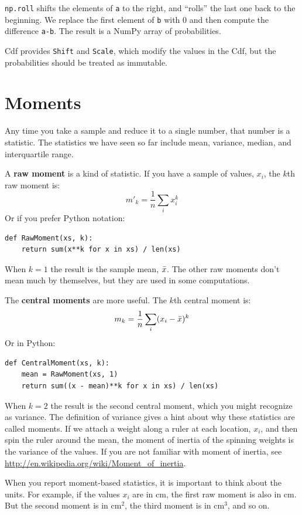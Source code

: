 \documentclass[12pt]{book}
\begin{document}
{\tt np.roll} shifts the elements of {\tt a} to the right, and ``rolls''
the last one back to the beginning.  We replace the first element of
{\tt b} with 0 and then compute the difference {\tt a-b}.  The result
is a NumPy array of probabilities.

Cdf provides {\tt Shift} and {\tt Scale}, which modify the
values in the Cdf, but the probabilities should be treated as
immutable.


\section{Moments}

Any time you take a sample and reduce it to a single number, that
number is a statistic.  The statistics we have seen so far include
mean, variance, median, and interquartile range.

A {\bf raw moment} is a kind of statistic.  If you have a sample of
values, $x_i$, the $k$th raw moment is:
%
\[ m'_k = \frac{1}{n} \sum_i x_i^k \]
%
Or if you prefer Python notation:

\begin{verbatim}
def RawMoment(xs, k):
    return sum(x**k for x in xs) / len(xs)
\end{verbatim}

When $k=1$ the result is the sample mean, $\bar{x}$.  The other
raw moments don't mean much by themselves, but they are used
in some computations.

The {\bf central moments} are more useful.  The
$k$th central moment is:
%
\[ m_k = \frac{1}{n} \sum_i (x_i - \bar{x})^k \]
%
Or in Python:

\begin{verbatim}
def CentralMoment(xs, k):
    mean = RawMoment(xs, 1)
    return sum((x - mean)**k for x in xs) / len(xs)
\end{verbatim}

When $k=2$ the result is the second central moment, which you might
recognize as variance.  The definition of variance gives a hint about
why these statistics are called moments.  If we attach a weight along a
ruler at each location, $x_i$, and then spin the ruler around
the mean, the moment of inertia of the spinning weights is the variance
of the values.  If you are not familiar with moment of inertia, see
\url{http://en.wikipedia.org/wiki/Moment_of_inertia}.  

When you report moment-based statistics, it is important to think
about the units.  For example, if the values $x_i$ are in cm, the
first raw moment is also in cm.  But the second moment is in
cm$^2$, the third moment is in cm$^3$, and so on.
\end{document}
